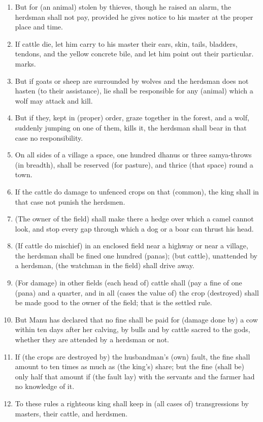 \begin{enumerate}
\item But for (an animal) stolen by thieves, though he raised an alarm, the herdsman shall not pay, provided he gives notice to his master at the proper place and time.
\item If cattle die, let him carry to his master their ears, skin, tails, bladders, tendons, and the yellow concrete bile, and let him point out their particular. marks.
\item But if goats or sheep are surrounded by wolves and the herdsman does not hasten (to their assistance), lie shall be responsible for any (animal) which a wolf may attack and kill.
\item But if they, kept in (proper) order, graze together in the forest, and a wolf, suddenly jumping on one of them, kills it, the herdsman shall bear in that case no responsibility.
\item On all sides of a village a space, one hundred dhanus or three samya-throws (in breadth), shall be reserved (for pasture), and thrice (that space) round a town.
\item If the cattle do damage to unfenced crops on that (common), the king shall in that case not punish the herdsmen.
\item (The owner of the field) shall make there a hedge over which a camel cannot look, and stop every gap through which a dog or a boar can thrust his head.
\item (If cattle do mischief) in an enclosed field near a highway or near a village, the herdsman shall be fined one hundred (panas);
(but cattle), unattended by a herdsman, (the watchman in the field) shall drive away.
\item (For damage) in other fields (each head of) cattle shall (pay a fine of one (pana) and a quarter, and in all (cases the value of) the crop (destroyed) shall be made good to the owner of the field; that is the settled rule.
\item But Manu has declared that no fine shall be paid for (damage done by) a cow within ten days after her calving, by bulls and by cattle sacred to the gods, whether they are attended by a herdsman or not.
\item If (the crops are destroyed by) the husbandman's (own) fault, the fine shall amount to ten times as much as (the king's) share; but the fine (shall be) only half that amount if (the fault lay) with the servants and the farmer had no knowledge of it.
\item To these rules a righteous king shall keep in (all cases of) transgressions by masters, their cattle, and herdsmen.

\end{enumerate}
